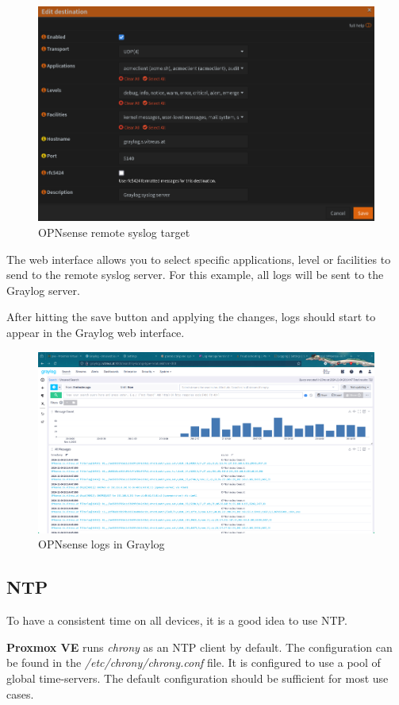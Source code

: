 \begin{figure}[H]
	\centering
	\includegraphics[width=0.8\linewidth]{Figures/opnsense-syslog-target.png}
	\caption{OPNsense remote syslog target}
\end{figure}
The web interface allows you to select specific applications, level or facilities to send to the remote syslog server. For this example, all logs will be sent to the Graylog server.

After hitting the save button and applying the changes, logs should start to appear in the Graylog web interface.

\begin{figure}[H]
	\centering
	\includegraphics[width=1\linewidth]{Figures/graylog-search-example-opnsense.png}
	\caption{OPNsense logs in Graylog}
\end{figure}

\subsection{NTP}

To have a consistent time on all devices, it is a good idea to use NTP. 

\textbf{Proxmox VE} runs \textit{chrony} as an NTP client by default. The configuration can be found in the \textit{/etc/chrony/chrony.conf} file. It is configured to use a pool of global time-servers. The default configuration should be sufficient for most use cases.

